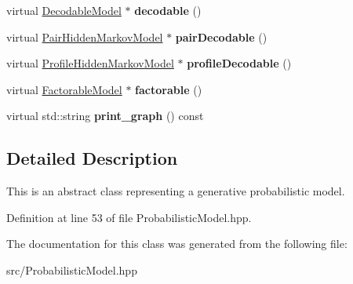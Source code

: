 \begin{DoxyCompactItemize}
virtual \hyperlink{classtops_1_1DecodableModel}{Decodable\+Model} $\ast$ {\bfseries decodable} ()
\item 
\mbox{\label{classtops_1_1ProbabilisticModel_a5d2300a6a09c78630501dfdabddd3161}} 
virtual \hyperlink{classtops_1_1PairHiddenMarkovModel}{Pair\+Hidden\+Markov\+Model} $\ast$ {\bfseries pair\+Decodable} ()
\item 
\mbox{\label{classtops_1_1ProbabilisticModel_afd243cce452b0f9faaf0d2d95b6d39e9}} 
virtual \hyperlink{classtops_1_1ProfileHiddenMarkovModel}{Profile\+Hidden\+Markov\+Model} $\ast$ {\bfseries profile\+Decodable} ()
\item 
\mbox{\label{classtops_1_1ProbabilisticModel_ab0f984d0ee8cda8ba67f19d98670b01b}} 
virtual \hyperlink{classtops_1_1FactorableModel}{Factorable\+Model} $\ast$ {\bfseries factorable} ()
\item 
\mbox{\label{classtops_1_1ProbabilisticModel_a558a526479c0b3fbc1f7f5820cbf7e7f}} 
virtual std\+::string {\bfseries print\+\_\+graph} () const
\end{DoxyCompactItemize}


\subsection{Detailed Description}
This is an abstract class representing a generative probabilistic model. 

Definition at line 53 of file Probabilistic\+Model.\+hpp.



The documentation for this class was generated from the following file\+:\begin{DoxyCompactItemize}
\item 
src/Probabilistic\+Model.\+hpp\end{DoxyCompactItemize}
